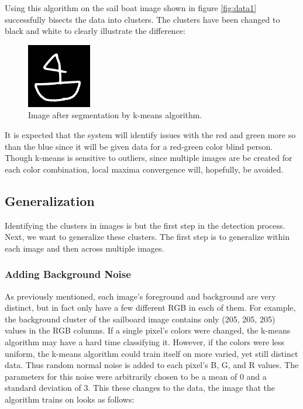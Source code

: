 \documentclass[12pt]{article}
\begin{document}
\begin{multicols}{2}
Using this algorithm on the sail boat image shown in figure \ref{fig:data1} successfully bisects the data into clusters. The clusters have been changed to black and white to clearly illustrate the difference:

\begin{figure}[H]
	\centering
	\includegraphics[width=0.25\textwidth]{img/data2_bw.png}
	\caption{Image after segmentation by k-means algorithm.}
	\label{fig:kmeans1}
\end{figure}

It is expected that the system will identify issues with the red and green more so than the blue since it will be given data for a red-green color blind person. Though k-means is sensitive to outliers, since multiple images are be created for each color combination, local maxima convergence will, hopefully, be avoided. 

\subsection{Generalization}
Identifying the clusters in images is but the first step in the detection process. Next, we want to generalize these clusters. The first step is to generalize within each image and then across multiple images.

\subsubsection{Adding Background Noise}
As previously mentioned, each image's foreground and background are very distinct, but in fact only have a few different RGB in each of them. For example, the background cluster of the sailboard image contains only (205, 205, 205) values in the RGB columns. If a single pixel's colors were changed, the k-means algorithm may have a hard time classifying it. However, if the colors were less uniform, the k-means algorithm could train itself on more varied, yet still distinct data. Thus random normal noise is added to each pixel's B, G, and R values. The parameters for this noise were arbitrarily chosen to be a mean of 0 and a standard deviation of 3. This these changes to the data, the image that the algorithm trains on looks as follows:


\end{multicols}
\end{document}

